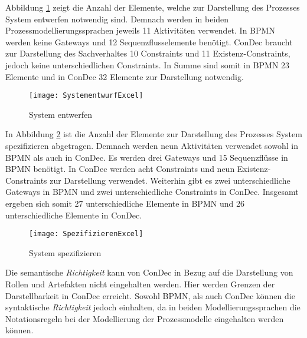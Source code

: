 Abbildung \ref{fig:SystementwurfExcel} zeigt die Anzahl der Elemente, welche zur Darstellung des Prozesses System entwerfen notwendig sind. Demnach werden in beiden Prozessmodellierungssprachen jeweils 11 Aktivitäten verwendet. In BPMN werden keine Gateways und 12 Sequenzflusselemente benötigt. ConDec braucht zur Darstellung des Sachverhaltes 10 Constraints und 11 Existenz-Constraints, jedoch keine unterschiedlichen Constraints. In Summe sind somit in BPMN 23 Elemente und in ConDec 32 Elemente zur Darstellung notwendig.\newline

\begin{figure}[!htbp]
\begin{center}
  \texttt{[image: SystementwurfExcel]} %
  \caption{System entwerfen}
  \label{fig:SystementwurfExcel}
\end{center}
\end{figure}

In Abbildung \ref{fig:SpezifizierenExcel} ist die Anzahl der Elemente zur Darstellung des Prozesses System spezifizieren abgetragen. Demnach werden neun Aktivitäten verwendet sowohl in BPMN als auch in ConDec. Es werden drei Gateways und 15 Sequenzflüsse in BPMN benötigt. In ConDec werden acht Constraints und neun Existenz-Constraints zur Darstellung verwendet. Weiterhin gibt es zwei unterschiedliche Gateways in BPMN und zwei unterschiedliche Constraints in ConDec. Insgesamt ergeben sich somit 27 unterschiedliche Elemente in BPMN und 26 unterschiedliche Elemente in ConDec. \newline

\begin{figure}[!htbp]
\begin{center}
  \texttt{[image: SpezifizierenExcel]} %
  \caption{System spezifizieren}
  \label{fig:SpezifizierenExcel}
\end{center}
\end{figure}

Die semantische \textit{Richtigkeit} kann von ConDec in Bezug auf die Darstellung von Rollen und Artefakten nicht eingehalten werden. Hier werden Grenzen der Darstellbarkeit in ConDec erreicht.\newline
Sowohl BPMN, als auch ConDec können die syntaktische \textit{Richtigkeit} jedoch einhalten, da in beiden Modellierungssprachen die Notationsregeln bei der Modellierung der Prozessmodelle eingehalten werden können.\newline
 
